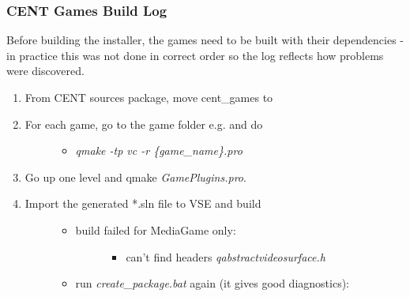 \documentclass[letterpaper,10pt,english]{sphinxmanual}
\begin{document}
\subsubsection{CENT Games Build Log}
\label{index:cent-games-build-log}\label{index:games-build-log}
Before building the installer, the games need to be built with their dependencies - in practice this was not done in correct order so the log reflects how problems were discovered.
\begin{enumerate}
\item {} 
From CENT sources package, move cent\_games to 

\item {} \begin{description}
\item[{For each game, go to the game folder e.g.  and do}] \leavevmode\begin{itemize}
\item {} 
\emph{qmake -tp vc -r \{game\_name\}.pro}

\end{itemize}

\end{description}

\item {} 
Go up one level and qmake \emph{GamePlugins.pro}.

\item {} \begin{description}
\item[{Import the generated *.sln file to VSE and build}] \leavevmode\begin{itemize}
\item {} \begin{description}
\item[{build failed for MediaGame only:}] \leavevmode\begin{itemize}
\item {} 
can't find headers \emph{qabstractvideosurface.h}

\end{itemize}

\end{description}

\item {} 
run \emph{create\_package.bat} again (it gives good diagnostics):

\end{itemize}


\end{description}
\end{enumerate}
\end{document}
